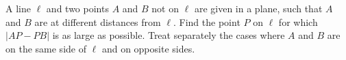 A line $\ell$ and two points $A$ and $B$ not on $\ell$ are given in a plane, such that $A$ and $B$ are at different distances from $\ell$. Find the point $P$ on $\ell$ for which $|AP-PB|$ is as large as possible. Treat separately the cases where $A$ and $B$ are on the same side of $\ell$ and on opposite sides.
